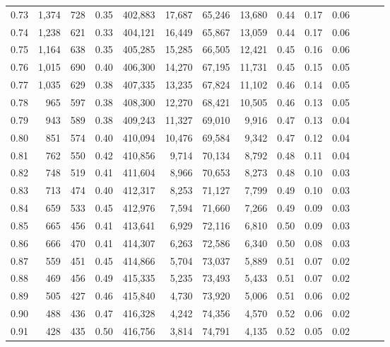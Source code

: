 \begin{tabular}{rrrrrrrrrrrrrr}
0.73 &  1,374 &    728 &  0.35 &  402,883 &   17,687 &  65,246 &  13,680 &  0.44 &  0.17 &      0.06 \\
0.74 &  1,238 &    621 &  0.33 &  404,121 &   16,449 &  65,867 &  13,059 &  0.44 &  0.17 &      0.06 \\
0.75 &  1,164 &    638 &  0.35 &  405,285 &   15,285 &  66,505 &  12,421 &  0.45 &  0.16 &      0.06 \\
0.76 &  1,015 &    690 &  0.40 &  406,300 &   14,270 &  67,195 &  11,731 &  0.45 &  0.15 &      0.05 \\
0.77 &  1,035 &    629 &  0.38 &  407,335 &   13,235 &  67,824 &  11,102 &  0.46 &  0.14 &      0.05 \\
0.78 &    965 &    597 &  0.38 &  408,300 &   12,270 &  68,421 &  10,505 &  0.46 &  0.13 &      0.05 \\
0.79 &    943 &    589 &  0.38 &  409,243 &   11,327 &  69,010 &   9,916 &  0.47 &  0.13 &      0.04 \\
0.80 &    851 &    574 &  0.40 &  410,094 &   10,476 &  69,584 &   9,342 &  0.47 &  0.12 &      0.04 \\
0.81 &    762 &    550 &  0.42 &  410,856 &    9,714 &  70,134 &   8,792 &  0.48 &  0.11 &      0.04 \\
0.82 &    748 &    519 &  0.41 &  411,604 &    8,966 &  70,653 &   8,273 &  0.48 &  0.10 &      0.03 \\
0.83 &    713 &    474 &  0.40 &  412,317 &    8,253 &  71,127 &   7,799 &  0.49 &  0.10 &      0.03 \\
0.84 &    659 &    533 &  0.45 &  412,976 &    7,594 &  71,660 &   7,266 &  0.49 &  0.09 &      0.03 \\
0.85 &    665 &    456 &  0.41 &  413,641 &    6,929 &  72,116 &   6,810 &  0.50 &  0.09 &      0.03 \\
0.86 &    666 &    470 &  0.41 &  414,307 &    6,263 &  72,586 &   6,340 &  0.50 &  0.08 &      0.03 \\
0.87 &    559 &    451 &  0.45 &  414,866 &    5,704 &  73,037 &   5,889 &  0.51 &  0.07 &      0.02 \\
0.88 &    469 &    456 &  0.49 &  415,335 &    5,235 &  73,493 &   5,433 &  0.51 &  0.07 &      0.02 \\
0.89 &    505 &    427 &  0.46 &  415,840 &    4,730 &  73,920 &   5,006 &  0.51 &  0.06 &      0.02 \\
0.90 &    488 &    436 &  0.47 &  416,328 &    4,242 &  74,356 &   4,570 &  0.52 &  0.06 &      0.02 \\
0.91 &    428 &    435 &  0.50 &  416,756 &    3,814 &  74,791 &   4,135 &  0.52 &  0.05 &      0.02 \\

\end{tabular}
